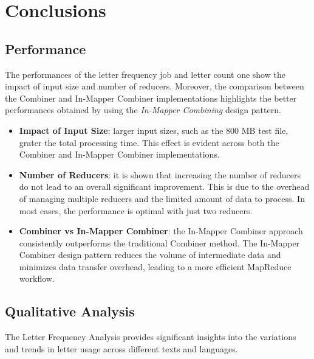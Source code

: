 \newpage
\section{Conclusions}

\subsection{Performance}

The performances of the letter frequency job and letter count one show the impact of input size and number of reducers. Moreover, the comparison between the Combiner and In-Mapper Combiner implementations highlights the better performances obtained by using the \textit{In-Mapper Combining} design pattern.

\begin{itemize}
\item \textbf{Impact of Input Size}: larger input sizes, such as the 800 MB test file, grater the total processing time. This effect is evident across both the Combiner and In-Mapper Combiner implementations.
\item \textbf{Number of Reducers}: it is shown that increasing the number of reducers do not lead to an overall significant improvement. This is due to the overhead of managing multiple reducers and the limited amount of data to process. In most cases, the performance is optimal with just two reducers.

\item \textbf{Combiner vs In-Mapper Combiner}: the In-Mapper Combiner approach consistently outperforms the traditional Combiner method. The In-Mapper Combiner design pattern reduces the volume of intermediate data and minimizes data transfer overhead, leading to a more efficient MapReduce workflow.
\end{itemize}


\subsection{Qualitative Analysis}

The Letter Frequency Analysis provides significant insights into the variations and trends in letter usage across different texts and languages.

